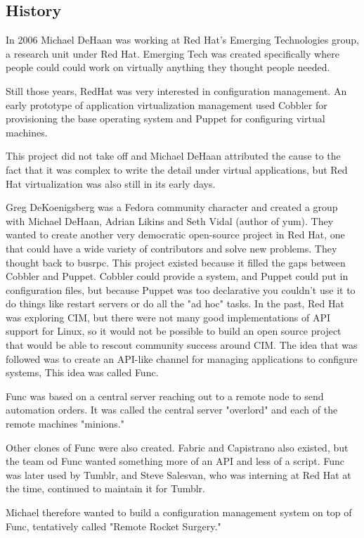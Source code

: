 \documentclass[12pt,a4paper,openright,twoside]{book}
\begin{document}
\subsection{History}
In 2006 Michael DeHaan was working at Red Hat's Emerging Technologies group, a research unit under Red Hat. Emerging Tech was created specifically where people could could work on virtually anything they thought people needed.

Still those years, RedHat was very interested in configuration management. An early prototype of application virtualization management used Cobbler for provisioning the base operating system and Puppet for configuring virtual machines.

This project did not take off and Michael DeHaan attributed the cause to the fact that it was complex to write the detail under virtual applications, but Red Hat virtualization was also still in its early days.

Greg DeKoenigsberg was a Fedora community character and created a group with Michael DeHaan, Adrian Likins and Seth Vidal (author of yum). They wanted to create another very democratic open-source project in Red Hat, one that could have a wide variety of contributors and solve new problems. They thought back to busrpc. This project existed because it filled the gaps between Cobbler and Puppet. Cobbler could provide a system, and Puppet could put in configuration files, but because Puppet was too declarative you couldn't use it to do things like restart servers or do all the "ad hoc" tasks. In the past, Red Hat was exploring CIM, but there were not many good implementations of API support for Linux, so it would not be possible to build an open source project that would be able to rescout community success around CIM. The idea that was followed was to create an API-like channel for managing applications to configure systems, This idea was called Func.

Func was based on a central server reaching out to a remote node to send automation orders. It was called the central server "overlord" and each of the remote machines "minions." 

Other clones of Func were also created. Fabric and Capistrano also existed, but the team od Func wanted something more of an API and less of a script. Func was later used by Tumblr, and Steve Salesvan, who was interning at Red Hat at the time, continued to maintain it for Tumblr.

Michael therefore wanted to build a configuration management system on top of Func, tentatively called "Remote Rocket Surgery."
\end{document}
